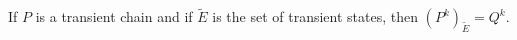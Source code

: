If $P$ is a transient chain and if $\tilde{E}$ is the set of transient states, then $(P^k)_{\tilde{E}} = Q^k$.
